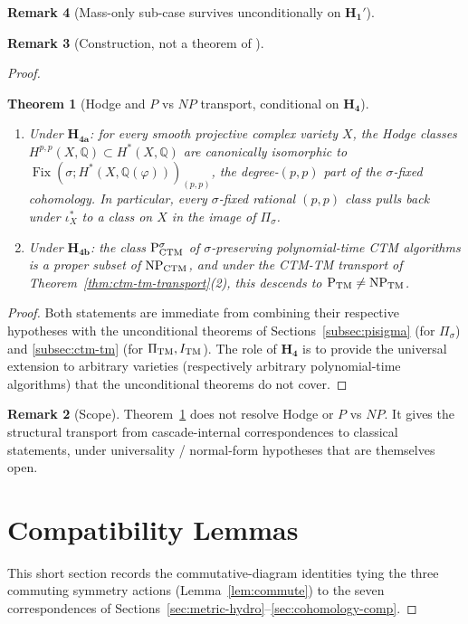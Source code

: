 \documentclass[11pt, a4paper]{amsart}
\newtheorem{theorem}{Theorem}[section]
\theoremstyle{definition}
\newtheorem{remark}[theorem]{Remark}
\newcommand{\Q}{\mathbb{Q}}
\newcommand{\pphi}{\varphi}
\newcommand{\TM}{{\rm TM}}
\newcommand{\Fix}{\operatorname{Fix}}
\begin{document}
\begin{remark}[Mass-only sub-case survives unconditionally on $\mathbf{H_1'}$]
\begin{remark}[Construction, not a theorem of \cite{CascadeEmbeddings}]
\begin{proof}
\begin{theorem}[Hodge and $P$ vs $NP$ transport, conditional on
$\mathbf{H_4}$]
\label{thm:universality-cond}
\begin{enumerate}
\item Under $\mathbf{H_{4a}}$: for every smooth projective complex
  variety $X$, the Hodge classes $H^{p, p}(X, \Q) \subset H^*(X, \Q)$
  are canonically isomorphic to $\Fix(\sigma;
  H^*(X, \Q(\pphi)))_{(p, p)}$, the degree-$(p,p)$ part of the
  $\sigma$-fixed cohomology. In particular, every $\sigma$-fixed
  rational $(p, p)$ class pulls back under $\iota_X^*$ to a class
  on $X$ in the image of $\Pi_\sigma$.
\item Under $\mathbf{H_{4b}}$: the class $\mathrm{P}_{\rm CTM}^\sigma$
  of $\sigma$-preserving polynomial-time CTM algorithms is a
  proper subset of $\mathrm{NP}_{\rm CTM}$, and under the
  CTM-TM transport of Theorem~\ref{thm:ctm-tm-transport}(2), this
  descends to $\mathrm{P}_{\rm TM} \neq \mathrm{NP}_{\rm TM}$.
\end{enumerate}
\end{theorem}

\begin{proof}
Both statements are immediate from combining their respective
hypotheses with the unconditional theorems of
Sections~\ref{subsec:pisigma} (for $\Pi_\sigma$) and
\ref{subsec:ctm-tm} (for $\Pi_{\TM}, I_{\TM}$). The role of
$\mathbf{H_4}$ is to provide the universal extension to arbitrary
varieties (respectively arbitrary polynomial-time algorithms) that
the unconditional theorems do not cover.
\end{proof}

\begin{remark}[Scope]
Theorem~\ref{thm:universality-cond} does not resolve Hodge or $P$
vs $NP$. It gives the structural transport from cascade-internal
correspondences to classical statements, under universality /
normal-form hypotheses that are themselves open.
\end{remark}

\section{Compatibility Lemmas}
\label{sec:compat}

This short section records the commutative-diagram identities
tying the three commuting symmetry actions (Lemma~\ref{lem:commute})
to the seven correspondences of
Sections~\ref{sec:metric-hydro}--\ref{sec:cohomology-comp}.


\end{proof}
\end{remark}
\end{remark}
\end{document}
